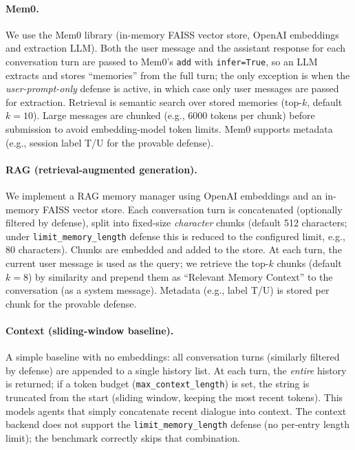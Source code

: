 \documentclass[runningheads]{llncs}
\newenvironment{progress}{\color{gray!50}}{}
\begin{document}
\begin{progress}
\paragraph{Mem0.}
We use the Mem0 library (in-memory FAISS vector store, OpenAI embeddings and extraction LLM). Both the user message and the assistant response for each conversation turn are passed to Mem0's \texttt{add} with \texttt{infer=True}, so an LLM extracts and stores ``memories'' from the full turn; the only exception is when the \emph{user-prompt-only} defense is active, in which case only user messages are passed for extraction. Retrieval is semantic search over stored memories (top-$k$, default $k=10$). Large messages are chunked (e.g., 6000 tokens per chunk) before submission to avoid embedding-model token limits. Mem0 supports metadata (e.g., session label T/U for the provable defense).

\paragraph{RAG (retrieval-augmented generation).}
We implement a RAG memory manager using OpenAI embeddings and an in-memory FAISS vector store. Each conversation turn is concatenated (optionally filtered by defense), split into fixed-size \emph{character} chunks (default 512 characters; under \texttt{limit\_memory\_length} defense this is reduced to the configured limit, e.g., 80 characters). Chunks are embedded and added to the store. At each turn, the current user message is used as the query; we retrieve the top-$k$ chunks (default $k=8$) by similarity and prepend them as ``Relevant Memory Context'' to the conversation (as a system message). Metadata (e.g., label T/U) is stored per chunk for the provable defense.

\paragraph{Context (sliding-window baseline).}
A simple baseline with no embeddings: all conversation turns (similarly filtered by defense) are appended to a single history list. At each turn, the \emph{entire} history is returned; if a token budget (\texttt{max\_context\_length}) is set, the string is truncated from the start (sliding window, keeping the most recent tokens). This models agents that simply concatenate recent dialogue into context. The context backend does not support the \texttt{limit\_memory\_length} defense (no per-entry length limit); the benchmark correctly skips that combination.


\end{progress}
\end{document}
